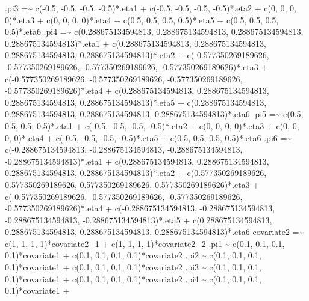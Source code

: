 \documentclass[
]{book}
\newenvironment{Shaded}{\begin{snugshade}}{\end{snugshade}}
\newcommand{\StringTok}[1]{\textcolor[rgb]{0.31,0.60,0.02}{#1}}
\begin{document}
\begin{Shaded}
\begin{Highlighting}[]
\StringTok{.pi3 =\textasciitilde{}}
\StringTok{    c({-}0.5, {-}0.5, {-}0.5, {-}0.5)*.eta1 +}
\StringTok{    c({-}0.5, {-}0.5, {-}0.5, {-}0.5)*.eta2 +}
\StringTok{    c(0, 0, 0, 0)*.eta3 +}
\StringTok{    c(0, 0, 0, 0)*.eta4 +}
\StringTok{    c(0.5, 0.5, 0.5, 0.5)*.eta5 +}
\StringTok{    c(0.5, 0.5, 0.5, 0.5)*.eta6}
\StringTok{.pi4 =\textasciitilde{}}
\StringTok{    c(0.288675134594813, 0.288675134594813, 0.288675134594813, 0.288675134594813)*.eta1 +}
\StringTok{    c(0.288675134594813, 0.288675134594813, 0.288675134594813, 0.288675134594813)*.eta2 +}
\StringTok{    c({-}0.577350269189626, {-}0.577350269189626, {-}0.577350269189626, {-}0.577350269189626)*.eta3 +}
\StringTok{    c({-}0.577350269189626, {-}0.577350269189626, {-}0.577350269189626, {-}0.577350269189626)*.eta4 +}
\StringTok{    c(0.288675134594813, 0.288675134594813, 0.288675134594813, 0.288675134594813)*.eta5 +}
\StringTok{    c(0.288675134594813, 0.288675134594813, 0.288675134594813, 0.288675134594813)*.eta6}
\StringTok{.pi5 =\textasciitilde{}}
\StringTok{    c(0.5, 0.5, 0.5, 0.5)*.eta1 +}
\StringTok{    c({-}0.5, {-}0.5, {-}0.5, {-}0.5)*.eta2 +}
\StringTok{    c(0, 0, 0, 0)*.eta3 +}
\StringTok{    c(0, 0, 0, 0)*.eta4 +}
\StringTok{    c({-}0.5, {-}0.5, {-}0.5, {-}0.5)*.eta5 +}
\StringTok{    c(0.5, 0.5, 0.5, 0.5)*.eta6}
\StringTok{.pi6 =\textasciitilde{}}
\StringTok{    c({-}0.288675134594813, {-}0.288675134594813, {-}0.288675134594813, {-}0.288675134594813)*.eta1 +}
\StringTok{    c(0.288675134594813, 0.288675134594813, 0.288675134594813, 0.288675134594813)*.eta2 +}
\StringTok{    c(0.577350269189626, 0.577350269189626, 0.577350269189626, 0.577350269189626)*.eta3 +}
\StringTok{    c({-}0.577350269189626, {-}0.577350269189626, {-}0.577350269189626, {-}0.577350269189626)*.eta4 +}
\StringTok{    c({-}0.288675134594813, {-}0.288675134594813, {-}0.288675134594813, {-}0.288675134594813)*.eta5 +}
\StringTok{    c(0.288675134594813, 0.288675134594813, 0.288675134594813, 0.288675134594813)*.eta6}
\StringTok{covariate2 =\textasciitilde{}}
\StringTok{    c(1, 1, 1, 1)*covariate2\_1 +}
\StringTok{    c(1, 1, 1, 1)*covariate2\_2}
\StringTok{.pi1 \textasciitilde{}}
\StringTok{    c(0.1, 0.1, 0.1, 0.1)*covariate1 +}
\StringTok{    c(0.1, 0.1, 0.1, 0.1)*covariate2}
\StringTok{.pi2 \textasciitilde{}}
\StringTok{    c(0.1, 0.1, 0.1, 0.1)*covariate1 +}
\StringTok{    c(0.1, 0.1, 0.1, 0.1)*covariate2}
\StringTok{.pi3 \textasciitilde{}}
\StringTok{    c(0.1, 0.1, 0.1, 0.1)*covariate1 +}
\StringTok{    c(0.1, 0.1, 0.1, 0.1)*covariate2}
\StringTok{.pi4 \textasciitilde{}}
\StringTok{    c(0.1, 0.1, 0.1, 0.1)*covariate1 +}

\end{Highlighting}
\end{Shaded}
\end{document}
